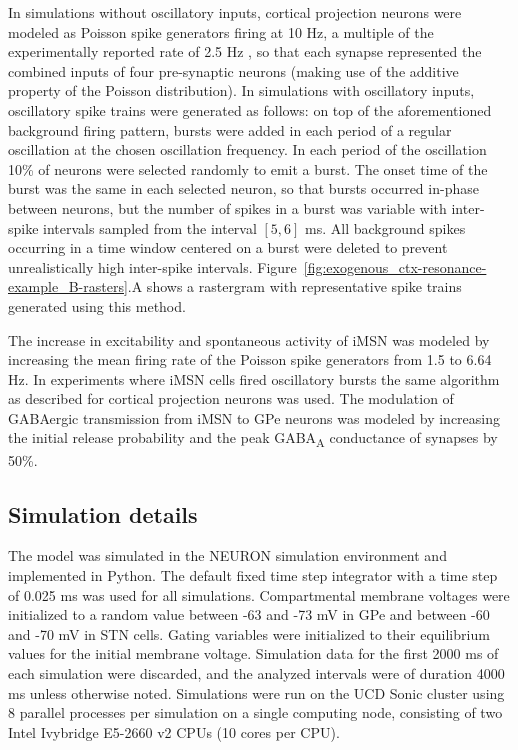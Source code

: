 %
In simulations without oscillatory inputs, cortical projection neurons were modeled as Poisson spike generators firing at 10 Hz, a multiple of the experimentally reported rate of 2.5 Hz \cite{li_therapeutic_2012}, so that each synapse represented the combined inputs of four pre-synaptic neurons (making use of the additive property of the Poisson distribution). In simulations with oscillatory inputs, oscillatory spike trains were generated as follows: on top of the aforementioned background firing pattern, bursts were added in each period of a regular oscillation at the chosen oscillation frequency. In each period of the oscillation 10\% of neurons were selected randomly to emit a burst. The onset time of the burst was the same in each selected neuron, so that bursts occurred in-phase between neurons, but the number of spikes in a burst was variable with inter-spike intervals sampled from the interval $[5, 6]$ ms. All background spikes occurring in a time window centered on a burst were deleted to prevent unrealistically high inter-spike intervals. Figure~\ref{fig:exogenous_ctx-resonance-example_B-rasters}.A shows a rastergram with representative spike trains generated using this method.

%
The increase in excitability and spontaneous activity of iMSN \cite{kita_cortical_2011,fieblinger_cell_2014} was modeled by increasing the mean
firing rate of the Poisson spike generators from 1.5 to 6.64 Hz. In experiments where iMSN
cells fired oscillatory bursts the same algorithm as described for cortical projection neurons
was used. The modulation of GABAergic transmission from iMSN to GPe
neurons \cite{cooper_dopamine_2001,shin_dopamine_2003} was modeled by increasing the
initial release probability and the peak GABA\textsubscript{A} conductance of synapses by 50\%.

\subsection{Simulation details}
%
%
The model was simulated in the NEURON simulation environment \cite{hines_neuron_1997} and implemented in Python. The default fixed time step integrator with a time step of 0.025 ms was used for all simulations. Compartmental membrane voltages were initialized to a random value between -63 and -73 mV in GPe and between -60 and -70 mV in STN cells. Gating variables were initialized to their equilibrium values for the initial membrane voltage. Simulation data for the first 2000 ms of each simulation were discarded, and the analyzed intervals were of duration 4000 ms unless otherwise noted. Simulations were run on the UCD Sonic cluster using 8 parallel processes per simulation on a single computing node, consisting of two Intel Ivybridge E5-2660 v2 CPUs (10 cores per CPU).
%
%

